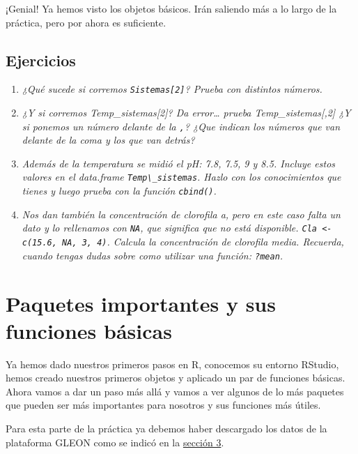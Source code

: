 \documentclass[
]{book}
\newcommand{\passthrough}[1]{#1}
\providecommand{\tightlist}{%
  \setlength{\itemsep}{0pt}\setlength{\parskip}{0pt}}
\begin{document}
¡Genial! Ya hemos visto los objetos básicos. Irán saliendo más a lo largo de la práctica, pero por ahora es suficiente.

\hypertarget{ejercicios}{%
\section{Ejercicios}\label{ejercicios}}

\begin{enumerate}
\def\labelenumi{\arabic{enumi}.}
\tightlist
\item
  \emph{¿Qué sucede si corremos \passthrough{\lstinline!Sistemas[2]!}? Prueba con distintos números.}
\item
  \emph{¿Y si corremos Temp\_sistemas{[}2{]}? Da error\ldots{} prueba Temp\_sistemas{[},2{]} ¿Y si ponemos un número delante de la \passthrough{\lstinline!,!}? ¿Que indican los números que van delante de la coma y los que van detrás?}
\item
  \emph{Además de la temperatura se midió el pH: 7.8, 7.5, 9 y 8.5. Incluye estos valores en el data.frame \passthrough{\lstinline!Temp\_sistemas!}. Hazlo con los conocimientos que tienes y luego prueba con la función \passthrough{\lstinline!cbind()!}.}
\item
  \emph{Nos dan también la concentración de clorofila a, pero en este caso falta un dato y lo rellenamos con \passthrough{\lstinline!NA!}, que significa que no está disponible. \passthrough{\lstinline!Cla <- c(15.6, NA, 3, 4)!}. Calcula la concentración de clorofila media. Recuerda, cuando tengas dudas sobre como utilizar una función: \passthrough{\lstinline!?mean!}.}
\end{enumerate}

\hypertarget{Tidyverse}{%
\chapter{Paquetes importantes y sus funciones básicas}\label{Tidyverse}}

Ya hemos dado nuestros primeros pasos en R, conocemos su entorno RStudio, hemos creado nuestros primeros objetos y aplicado un par de funciones básicas. Ahora vamos a dar un paso más allá y vamos a ver algunos de lo más paquetes que pueden ser más importantes para nosotros y sus funciones más útiles.

Para esta parte de la práctica ya debemos haber descargado los datos de la plataforma GLEON como se indicó en la \protect\hyperlink{Descarga}{sección 3}.
\end{document}
